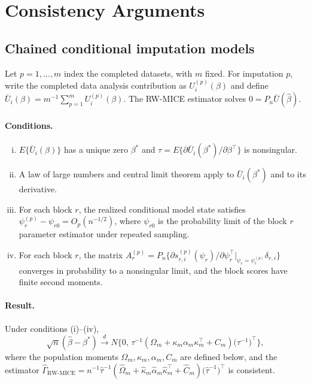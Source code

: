 \section{Consistency Arguments}\label{appendix-theory}
\subsection{Chained conditional imputation models}\label{appendix mice}
Let \(p=1,\ldots,m\) index the completed datasets, with \(m\) fixed.
For imputation \(p\), write the completed data analysis contribution as
\(U_i^{(p)}(\beta)\) and define
\(\bar U_i(\beta)=m^{-1}\sum_{p=1}^m U_i^{(p)}(\beta)\).
The RW-MICE estimator solves \(0=P_n\bar U(\hat\beta)\).
\paragraph{Conditions.}
\begin{enumerate}[(i)]
  \item \(E\{\bar U_i(\beta)\}\) has a unique zero \(\beta^\ast\) and
        \(\tau=E\{\partial\bar U_i(\beta^\ast)/\partial\beta^\top\}\)
        is nonsingular.
  \item A law of large numbers and central limit theorem apply to
        \(\bar U_i(\beta^\ast)\) and to its derivative.
  \item For each block \(r\), the realized conditional model state
        satisfies \(\psi_r^{(p)}-\psi_{r0}=O_p(n^{-1/2})\), where
        \(\psi_{r0}\) is the probability limit of the block \(r\)
        parameter estimator under repeated sampling.
  \item For each block \(r\), the matrix
        \(A_r^{(p)}=P_n\bigl\{\partial s_{r,i}^{(p)}(\psi_r)/
        \partial\psi_r^\top\big|_{\psi_r=\psi_r^{(p)}}\delta_{r,i}\bigr\}\)
        converges in probability to a nonsingular limit, and the block
        scores have finite second moments.
\end{enumerate}
\paragraph{Result.}
Under conditions (i)--(iv),
\[
\sqrt n(\hat\beta-\beta^\ast)
\xrightarrow{d}
N\bigl\{0,\,\tau^{-1}(\Omega_m+\kappa_m\alpha_m\kappa_m^\top+C_m)
\bigl(\tau^{-1}\bigr)^{\top}\bigr\},
\]
where the population moments \(\Omega_m,\kappa_m,\alpha_m,C_m\) are
defined below, and the estimator
\(\widehat\Gamma_{\mathrm{RW\text{-}MICE}}
=n^{-1}\widehat\tau^{-1}(\widehat\Omega_m
+\widehat\kappa_m\widehat\alpha_m\widehat\kappa_m^\top
+\widehat C_m)\bigl(\widehat\tau^{-1}\bigr)^{\top}\)
is consistent.
